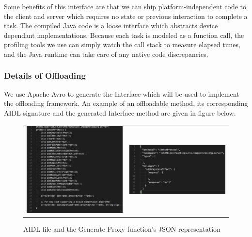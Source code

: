 \documentclass{sig-alternate}
\begin{document}
Some benefits of this interface are that we can ship platform-independent code to the client and server which requires no state or previous interaction to complete a task. The compiled Java code is a loose interface which abstracts device dependant implementations. Because each task is modeled as a function call, the profiling tools we use can simply watch the call stack to measure elapsed times, and the Java runtime can take care of any native code discrepancies. 

\subsubsection{Details of Offloading}
 We use Apache Avro to generate the Interface which will be used to implement the offloading framework. An example of an offloadable method, its corresponding AIDL signature and the generated Interface method are given in figure below.
 \begin{figure}[h]
 \begin{tabular}{l  r }
\noindent \includegraphics[scale=.2]{AIDLFile.png} & \includegraphics[scale=.2]{AvroGenerated.png} \\ 
\end{tabular}
\caption{AIDL file and the Generate Proxy function's JSON representation}
\end{figure}
\end{document}
